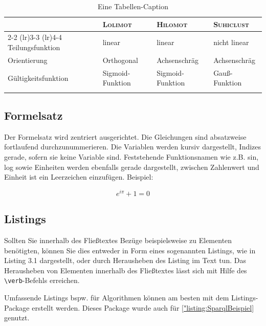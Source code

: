 \begin{table}
	\caption{Eine Tabellen-Caption}
	\renewcommand{\arraystretch}{1.3}
	\begin{tabular}{llll}
		\toprule[1pt]
		& \textsc{Lolimot}	& \textsc{Hilomot} 	& \textsc{Suhiclust}	\\ 
		\cmidrule[1pt](lr){2-2} \cmidrule[1pt](lr){3-3} \cmidrule[1pt](lr){4-4} %
		Teilungsfunktion    & linear 			& linear			& nicht linear \\ 
		Orientierung        & Orthogonal 		& Achsenschräg 		& Achsenschräg \\ %
		Gültigkeitsfunktion	& Sigmoid-Funktion 	& Sigmoid-Funktion 	& Gauß-Funktion \\
		\bottomrule[1pt]
		\label{tab:Tabelle}
	\end{tabular}
\end{table}

			
			

\subsection{Formelsatz}
Der Formelsatz wird zentriert ausgerichtet. Die Gleichungen sind absatzweise fortlaufend durchzunummerieren. Die Variablen werden kursiv dargestellt, Indizes gerade, sofern sie keine Variable sind. Feststehende Funktionsnamen wie z.B. sin, log sowie Einheiten werden ebenfalls gerade dargestellt, zwischen Zahlenwert und Einheit ist ein Leerzeichen einzufügen. Beispiel: 

\begin{equation}
	e^{i\pi} + 1 = 0
\end{equation}

\subsection{Listings}
Sollten Sie innerhalb des Fließtextes Bezüge beispielsweise zu Elementen benötigten, können Sie dies entweder in Form eines sogenannten Listings, wie in Listing 3.1 dargestellt, oder durch Herausheben des Listing im Text tun. Das Herausheben von Elementen innerhalb des Fließtextes lässt sich mit Hilfe des \verb|\verb|-Befehls erreichen.

Umfassende Listings bspw. für Algorithmen können am besten mit dem Listings-Package erstellt werden. Dieses Package wurde auch für \ref{"listing:SparqlBeispiel} genutzt.


